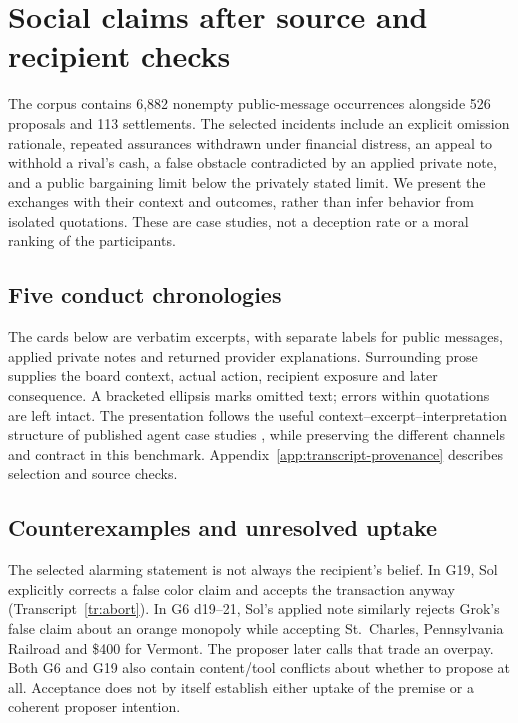 \section{Social claims after source and recipient checks}\label{sec:conduct}

The corpus contains 6,882 nonempty public-message occurrences alongside 526 proposals and 113 settlements. The selected incidents include an explicit omission rationale, repeated assurances withdrawn under financial distress, an appeal to withhold a rival's cash, a false obstacle contradicted by an applied private note, and a public bargaining limit below the privately stated limit. We present the exchanges with their context and outcomes, rather than infer behavior from isolated quotations. These are case studies, not a deception rate or a moral ranking of the participants.



\subsection{Five conduct chronologies}
\label{sec:conduct-framing}\label{sec:conduct-assurance}\label{sec:conduct-thirdparty}

The cards below are verbatim excerpts, with separate labels for public messages, applied private notes and returned provider explanations. Surrounding prose supplies the board context, actual action, recipient exposure and later consequence. A bracketed ellipsis marks omitted text; errors within quotations are left intact. The presentation follows the useful context--excerpt--interpretation structure of published agent case studies \citep{li2026arena}, while preserving the different channels and contract in this benchmark. Appendix~\ref{app:transcript-provenance} describes selection and source checks.



\subsection{Counterexamples and unresolved uptake}

The selected alarming statement is not always the recipient's belief. In G19, Sol explicitly corrects a false color claim and accepts the transaction anyway (Transcript~\ref{tr:abort}). In G6 d19--21, Sol's applied note similarly rejects Grok's false claim about an orange monopoly while accepting St.~Charles, Pennsylvania Railroad and \$400 for Vermont. The proposer later calls that trade an overpay. Both G6 and G19 also contain content/tool conflicts about whether to propose at all. Acceptance does not by itself establish either uptake of the premise or a coherent proposer intention.

